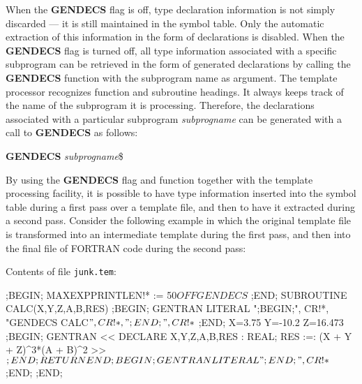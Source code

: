 When the {\bf GENDECS} flag is off, type declaration information is not
simply discarded --- it is still maintained in the symbol table.  Only the
automatic extraction of this information in the form of declarations is
disabled.  When the {\bf GENDECS} flag is turned off, all type
information associated with a specific subprogram can be retrieved in the
form of generated declarations by calling the {\bf GENDECS} function with
the subprogram name as argument.  The template processor recognizes
function and subroutine headings.  It always keeps track of the name of
the subprogram it is processing.  Therefore, the declarations associated with
a particular subprogram {\it subprogname} can be generated with a call to
{\bf GENDECS} as follows:
\begin{center}
{\bf GENDECS} {\it subprogname}\$
\end{center}

By using the {\bf GENDECS} flag and function together with the template
processing facility, it is possible to have type information
inserted into the symbol table during a first pass over a template file, and
then to have it extracted during a second pass.  Consider the following
example in which the original template file is transformed into an
intermediate template during the first pass, and then into the final file
of FORTRAN code during the second pass:

Contents of file {\tt junk.tem}:
\begin{framedverbatim}
;BEGIN;                                       
MAXEXPPRINTLEN!* := 50$                       
OFF GENDECS$                                  
;END;                                         
      SUBROUTINE CALC(X,Y,Z,A,B,RES)          
;BEGIN;                                       
GENTRAN LITERAL ";BEGIN;", CR!*,              
                "GENDECS CALC$", CR!*,        
                 ";END;", CR!*$                
;END;                                         
      X=3.75                                  
      Y=-10.2                                 
      Z=16.473                                
;BEGIN;                                       
GENTRAN                                       
<<                                            
    DECLARE X,Y,Z,A,B,RES : REAL;           
    RES :=: (X + Y + Z)^3*(A + B)^2           
>>$                                           
;END;                                         
      RETURN                                  
      END                                     
;BEGIN;                                       
GENTRAN LITERAL ";END;", CR!*$                
;END;                                         
;END;                                         
\end{framedverbatim} 

